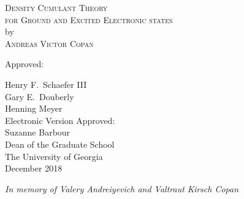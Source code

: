 \documentclass[12pt,notitlepage]{report}
\newcommand{\dissertationtitle}{%
    Density Cumulant Theory\\for Ground and Excited Electronic states}
\newcommand{\whoami}{Andreas Victor Copan}
\begin{document}
\newpage
\thispagestyle{empty}
\vspace*{18pt}
\begin{center}
\textsc{\large{\dissertationtitle}}\\[18pt]
by\\[18pt]
\textsc{\whoami}
\end{center}
\vfill
\begin{flushleft}\singlespacing
\hskip 200pt {Approved:}\\
\vspace{12pt}

\hspace*{200pt}Henry F.~Schaefer III\\
\vspace{12pt}
\hspace*{200pt}Gary E.~Douberly\\
\hspace*{200pt}\makebox[100pt][l]{}Henning Meyer\\
\vfill
Electronic Version Approved:\\[12pt]
Suzanne Barbour\\
Dean of the Graduate School\\
The University of Georgia\\
December 2018
\end{flushleft}

\newpage
\vspace*{1.5in}
\begin{center}
\emph{In memory of Valery Andreiyevich and Valtraut Kirsch Copan}\\
\vspace{6pt}
\end{center}



\tableofcontents
\clearpage
{}







\begin{appendices}
	
\end{appendices}

\newpage


\end{document}
